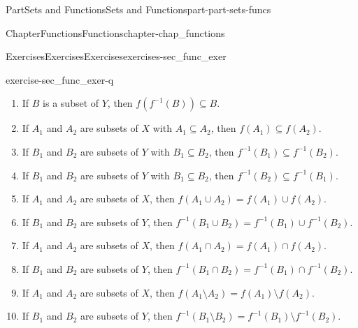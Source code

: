 \documentclass[oneside,10pt,]{book}
\numberwithin{equation}{chapter}
\begin{document}
\begin{partptx}{Part}{Sets and Functions}{}{Sets and Functions}{}{}{part-part-sets-funcs}
\begin{chapterptx}{Chapter}{Functions}{}{Functions}{}{}{chapter-chap_functions}
\begin{exercises-section}{Exercises}{Exercises}{}{Exercises}{}{}{exercises-sec_func_exer}
\begin{divisionexercise}{17}{}{}{exercise-sec_func_exer-q}
\begin{enumerate}[font=\bfseries,label=(\alph*),ref=\alph*]
\item{}If \(B\) is a subset of \(Y\), then \(f(f^{-1}(B)) \subseteq B\).%
\item{}If \(A_1\) and \(A_2\) are subsets of \(X\) with \(A_1 \subseteq A_2\), then \(f(A_1) \subseteq f(A_2)\).%
\item{}If \(B_1\) and \(B_2\) are subsets of \(Y\) with \(B_1 \subseteq B_2\), then \(f^{-1}(B_1) \subseteq f^{-1}(B_2)\).%
\item{}If \(B_1\) and \(B_2\) are subsets of \(Y\) with \(B_1 \subseteq B_2\), then \(f^{-1}(B_2) \subseteq f^{-1}(B_1)\).%
\item{}If \(A_1\) and \(A_2\) are subsets of \(X\), then \(f(A_1 \cup A_2) = f(A_1) \cup f(A_2)\).%
\item{}If \(B_1\) and \(B_2\) are subsets of \(Y\), then \(f^{-1}(B_1 \cup B_2) = f^{-1}(B_1) \cup f^{-1}(B_2)\).%
\item{}If \(A_1\) and \(A_2\) are subsets of \(X\), then \(f(A_1 \cap A_2) = f(A_1) \cap f(A_2)\).%
\item{}If \(B_1\) and \(B_2\) are subsets of \(Y\), then \(f^{-1}(B_1 \cap B_2) = f^{-1}(B_1) \cap f^{-1}(B_2)\).%
\item{}If \(A_1\) and \(A_2\) are subsets of \(X\), then \(f(A_1 \setminus A_2) = f(A_1) \setminus f(A_2)\).%
\item{}If \(B_1\) and \(B_2\) are subsets of \(Y\), then \(f^{-1}(B_1 \setminus B_2) = f^{-1}(B_1) \setminus f^{-1}(B_2)\).%
\end{enumerate}%
\end{divisionexercise}%
\end{exercises-section}
\end{chapterptx}
\end{partptx}
%
%
\typeout{************************************************}
\typeout{************************************************}
%
\end{document}
